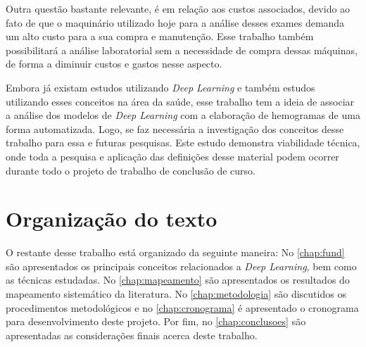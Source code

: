 Outra questão bastante relevante, é em relação aos custos associados, devido ao fato de que o maquinário utilizado hoje para a análise desses exames demanda um alto custo para a sua compra e manutenção. Esse trabalho também possibilitará a análise laboratorial sem a necessidade de compra dessas máquinas, de forma a diminuir custos e gastos nesse aspecto.

Embora já existam estudos utilizando \emph{Deep Learning} e também estudos utilizando esses conceitos na área da saúde, esse trabalho tem a ideia de associar a análise dos modelos de \emph{Deep Learning} com a elaboração de hemogramas de uma forma automatizada. Logo, se faz necessária a investigação dos conceitos desse trabalho para essa e futuras pesquisas. Este estudo demonstra viabilidade técnica, onde toda a pesquisa e aplicação das definições desse material podem ocorrer durante todo o projeto de trabalho de conclusão de curso.

\section{Organização do texto}
\label{sec:organizacao}

O restante desse trabalho está organizado da seguinte maneira: No \autoref{chap:fund} são apresentados os principais conceitos relacionados a \emph{Deep Learning}, bem como as técnicas estudadas. No \autoref{chap:mapeamento} são apresentados os resultados do mapeamento sistemático da literatura. No \autoref{chap:metodologia} são discutidos os procedimentos metodológicos e no \autoref{chap:cronograma} é apresentado o cronograma para desenvolvimento deste projeto. Por fim, no \autoref{chap:conclusoes} são apresentadas as considerações finais acerca deste trabalho.